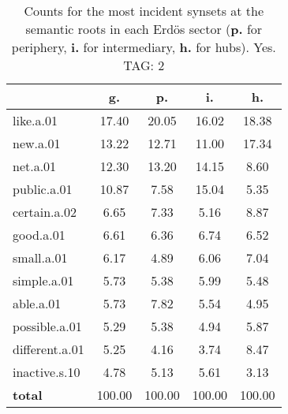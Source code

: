 \begin{table}[h!]
\begin{center}
\begin{tabular}{| l | c | c | c | c |}\hline
 & g. & p. & i. & h. \\\hline
like.a.01 & 17.40  & 20.05  & 16.02  & 18.38 \\\hline
new.a.01 & 13.22  & 12.71  & 11.00  & 17.34 \\\hline
net.a.01 & 12.30  & 13.20  & 14.15  & 8.60 \\\hline
public.a.01 & 10.87  & 7.58  & 15.04  & 5.35 \\\hline
certain.a.02 & 6.65  & 7.33  & 5.16  & 8.87 \\\hline
good.a.01 & 6.61  & 6.36  & 6.74  & 6.52 \\\hline
small.a.01 & 6.17  & 4.89  & 6.06  & 7.04 \\\hline
simple.a.01 & 5.73  & 5.38  & 5.99  & 5.48 \\\hline
able.a.01 & 5.73  & 7.82  & 5.54  & 4.95 \\\hline
possible.a.01 & 5.29  & 5.38  & 4.94  & 5.87 \\\hline
different.a.01 & 5.25  & 4.16  & 3.74  & 8.47 \\\hline
inactive.s.10 & 4.78  & 5.13  & 5.61  & 3.13 \\\hline
{{\bf total}} & 100.00  & 100.00  & 100.00  & 100.00 \\\hline
\end{tabular}
\caption{Counts for the most incident synsets at the semantic roots in each Erd\"os sector ({\bf p.} for periphery, {\bf i.} for intermediary, {\bf h.} for hubs). Yes. TAG: 2}
\end{center}
\end{table}